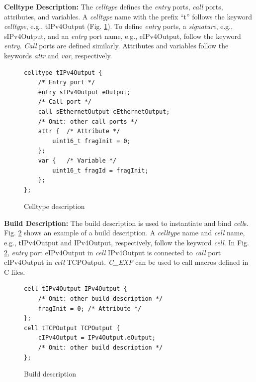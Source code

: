 \documentclass[conference]{IEEEtran/IEEEtran}
\begin{document}
{\bf Celltype Description:}
The {\it celltype} defines the {\it entry} ports, {\it call} ports, attributes, and variables.
A {\it celltype} name with the prefix ``t'' follows the keyword {\it celltype}, e.g., tIPv4Output (Fig. \ref{src:celltype}).
To define {\it entry} ports, a {\it signature}, e.g., sIPv4Output, and an {\it entry} port name, e.g., eIPv4Output, follow the keyword {\it entry}.
{\it Call} ports are defined similarly.
Attributes and variables follow the keywords {\it attr} and {\it var}, respectively.

\begin{figure}[t]
\centering
\begin{lstlisting}
celltype tIPv4Output {
    /* Entry port */
    entry sIPv4Output eOutput;
    /* Call port */
    call sEthernetOutput cEthernetOutput;
    /* Omit: other call ports */
    attr {  /* Attribute */
        uint16_t fragInit = 0;
    };
    var {   /* Variable */
        uint16_t fragId = fragInit;
    };
};
\end{lstlisting}
\vspace{-1mm} \caption{Celltype description}
\vspace{-1mm} \label{src:celltype}
\end{figure}

{\bf Build Description:}
The build description is used to instantiate and bind {\it cell}s.
Fig. \ref{src:build} shows an example of a build description.
A {\it celltype} name and {\it cell} name, e.g., tIPv4Output and IPv4Output, respectively, follow the keyword {\it cell}.
In Fig. \ref{src:build}, {\it entry} port eIPv4Output in {\it cell} IPv4Output is connected to {\it call} port cIPv4Output in {\it cell} TCPOutput.
{\it C\_EXP} can be used to call macros defined in C files.

\begin{figure}[t]
\centering
\begin{lstlisting}
cell tIPv4Output IPv4Output {
    /* Omit: other build description */
    fragInit = 0; /* Attribute */
};
cell tTCPOutput TCPOutput {
    cIPv4Output = IPv4Output.eOutput;
    /* Omit: other build description */
};
\end{lstlisting}
\vspace{-1mm} \caption{Build description}
\vspace{-1mm} \label{src:build}
\end{figure}
\end{document}
